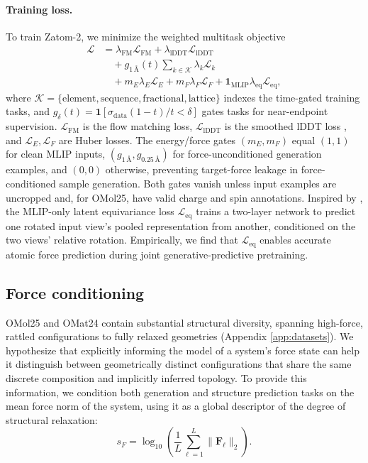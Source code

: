 \documentclass{article} %
\begin{document}
\paragraph{Training loss.}
To train Zatom-2, we minimize the weighted multitask objective
\begin{equation}
\begin{aligned}
\mathcal{L} &= \lambda_{\mathrm{FM}}\mathcal{L}_{\mathrm{FM}}
+ \lambda_{\mathrm{lDDT}}\mathcal{L}_{\mathrm{lDDT}} \\
&\quad + g_{1\,\text{\AA}}(t)
  \sum_{k\in\mathcal{K}}
  \lambda_k\mathcal{L}_k \\
&\quad + m_E\lambda_E\mathcal{L}_E
+ m_F\lambda_F\mathcal{L}_F
+ \mathbf{1}_{\mathrm{MLIP}}\lambda_{\mathrm{eq}}\mathcal{L}_{\mathrm{eq}},
\end{aligned}
\label{eq:zatom2-objective}
\end{equation}
where $\mathcal{K}=\{\mathrm{element},\mathrm{sequence},\mathrm{fractional},\mathrm{lattice}\}$ indexes the time-gated training tasks, and $g_\delta(t)=\mathbf{1}[\sigma_{\mathrm{data}}(1-t)/t<\delta]$ gates tasks for near-endpoint supervision. $\mathcal{L}_{\mathrm{FM}}$ is the flow matching loss,
$\mathcal{L}_{\mathrm{lDDT}}$ is the smoothed lDDT loss \citep{mariani2013lddt, butcher2025rfdiffusion3}, and
$\mathcal{L}_E,\mathcal{L}_F$ are Huber losses. The energy/force gates $(m_E,m_F)$ equal $(1,1)$ for clean MLIP inputs, $(g_{1\,\text{\AA}},g_{0.25\,\text{\AA}})$ for force-unconditioned generation examples, and $(0,0)$ otherwise, preventing target-force leakage in force-conditioned sample generation. Both gates vanish unless input examples are uncropped and, for OMol25, have valid charge and spin annotations. Inspired by \citep{elhag2025learning}, the MLIP-only latent equivariance loss $\mathcal{L}_{\mathrm{eq}}$ trains a two-layer network to predict one rotated input view's pooled representation from another, conditioned on the two views' relative rotation. Empirically, we find that $\mathcal{L}_{\mathrm{eq}}$ enables accurate atomic force prediction during joint generative-predictive pretraining.

\subsection{Force conditioning}
\label{sec:force-conditioning}

OMol25 and OMat24 contain substantial structural diversity, spanning high-force, rattled configurations to fully relaxed geometries (Appendix \ref{app:datasets}). We hypothesize that explicitly informing the model of a system’s force state can help it distinguish between geometrically distinct configurations that share the same discrete composition and implicitly inferred topology. To provide this information, we condition both generation and structure prediction tasks on the mean force norm of the system, using it as a global descriptor of the degree of structural relaxation:
\begingroup
\small
\begin{equation}
  s_F = \log_{10}\!\left(
  \frac{1}{L}\sum_{\ell=1}^{L}
  \lVert \mathbf{F}_{\ell}\rVert_2\right).
  \label{eq:force-condition}
\end{equation}
\endgroup
\end{document}
